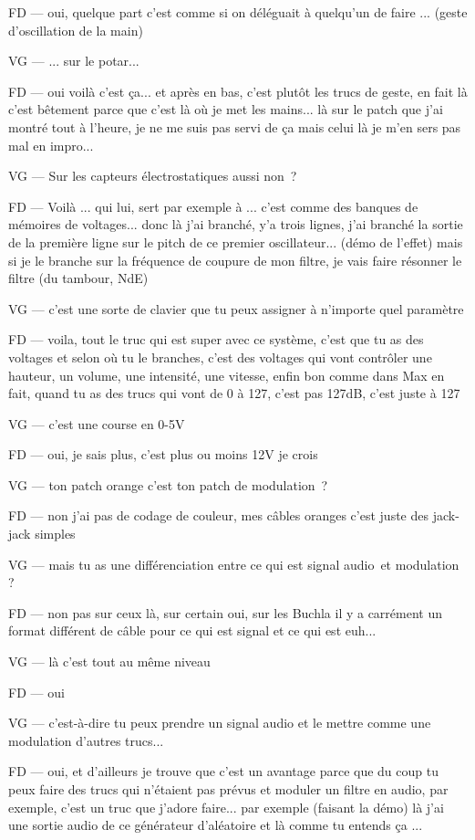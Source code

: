 FD — oui, quelque part c'est comme si on déléguait à quelqu'un de faire ... (geste d'oscillation de la main) 

VG — ... sur le potar... 

FD — oui voilà c'est ça... et après en bas, c'est plutôt les trucs de geste, en fait là c'est bêtement parce que c'est là où je met les mains...  là sur le patch que j'ai montré tout à l'heure, je ne me suis pas servi de ça mais celui là je m'en sers pas mal en impro... 

VG — Sur les capteurs électrostatiques aussi non ? 

FD — Voilà ... qui lui, sert par exemple à ... c'est comme des banques de mémoires de voltages... donc là j'ai branché, y'a trois lignes, j'ai branché la sortie de la première ligne sur le pitch de ce premier oscillateur... (démo de l'effet) mais si je le branche sur la fréquence de coupure de mon filtre, je vais faire résonner le filtre (du tambour, NdE) 

VG — c'est une sorte de clavier que tu peux assigner à n'importe quel paramètre 

FD — voila, tout le truc qui est super avec ce système, c'est que tu as des voltages et selon où tu le branches, c'est des voltages qui vont contrôler une hauteur, un volume, une intensité, une vitesse, enfin bon comme dans Max en fait, quand tu as des trucs qui vont de 0 à 127, c'est pas 127dB, c'est juste à 127  

VG — c'est une course en 0-5V 

FD — oui, je sais plus, c'est plus ou moins 12V je crois 

VG — ton patch orange c'est ton patch de modulation ? 

FD — non j'ai pas de codage de couleur, mes câbles oranges c'est juste des jack-jack simples 

VG — mais tu as une différenciation entre ce qui est signal audio et modulation ? 

FD — non pas sur ceux là, sur certain oui, sur les Buchla il y a carrément un format différent de câble pour ce qui est signal et ce qui est euh... 

VG — là c'est tout au même niveau 

FD — oui 

VG — c'est-à-dire tu peux prendre un signal audio et le mettre comme une modulation d'autres trucs... 

FD — oui, et d'ailleurs je trouve que c'est un avantage parce que du coup tu peux faire des trucs qui n'étaient pas prévus et moduler un filtre en audio, par exemple, c'est un truc que j'adore faire... par exemple (faisant la démo) là j'ai une sortie audio de ce générateur d'aléatoire et là comme tu entends ça ... 

